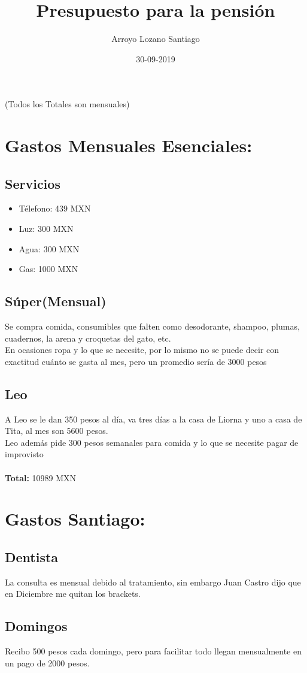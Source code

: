 \documentclass[13pt,letterpaper]{article}
\title{Presupuesto para la pensión}
\date{30-09-2019}
\author{Arroyo Lozano Santiago}
\begin{document}
  \maketitle

  (Todos los Totales son mensuales)
  \section{Gastos Mensuales Esenciales:}
  \subsection{Servicios}
    \begin{itemize}
      \item Télefono: 439 MXN
      \item Luz: 300 MXN
      \item Agua: 300 MXN
      \item Gas: 1000 MXN
    \end{itemize}
  \subsection{Súper(Mensual)}
    Se compra comida, consumibles que falten como desodorante, shampoo, plumas, cuadernos, la arena y croquetas del gato, etc. \\
    En ocasiones ropa y lo que se necesite, por lo mismo no se puede decir con exactitud cuánto se gasta al mes, pero un promedio sería de 3000 pesos
    \subsection{Leo}
    A Leo se le dan 350 pesos al día, va tres días a la casa de Liorna y uno a casa de Tita, al mes son 5600 pesos. \\
    Leo además pide 300 pesos semanales para comida y lo que se necesite pagar de improvisto \\ \\
  \textbf{Total:} 10989 MXN
  \section{Gastos Santiago:}
  \subsection{Dentista}
    La consulta es mensual debido al tratamiento, sin embargo Juan Castro dijo que en Diciembre me quitan los brackets.
    \subsection{Domingos}
      Recibo 500 pesos cada domingo, pero para facilitar todo llegan mensualmente en un pago de 2000 pesos.
\end{document}
